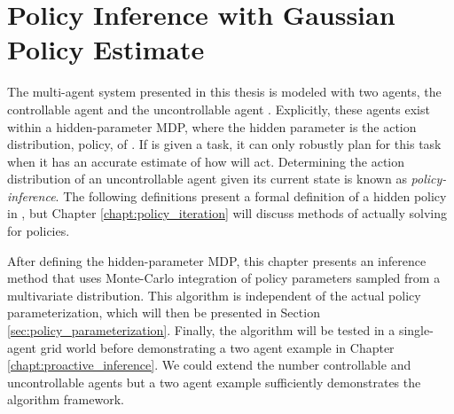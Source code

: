 %
%
\chapter{Policy Inference with Gaussian Policy Estimate}\label{chapt:gauss_policy}

    The multi-agent system presented in this thesis is modeled with two agents, the controllable agent  and the
    uncontrollable agent . Explicitly, these agents exist within a hidden-parameter \ac{MDP}, where the hidden
    parameter is the action distribution, policy, of . If  is given a task, it can only robustly plan
    for this task when it has an accurate estimate of how  will act. Determining the action distribution of an
    uncontrollable agent given its current state is known as \textit{policy-inference}. The following definitions
    present a formal definition of a hidden policy in , but Chapter \ref{chapt:policy_iteration} will discuss
    methods of actually solving for policies.

    After defining the hidden-parameter MDP, this chapter presents an inference method that uses Monte-Carlo integration
    of policy parameters sampled from a multivariate distribution. This algorithm is independent of the actual policy
    parameterization, which will then be presented in Section \ref{sec:policy_parameterization}.  Finally, the algorithm
    will be tested in a single-agent grid world before demonstrating a two agent example in Chapter
    \ref{chapt:proactive_inference}. We could extend the number controllable and uncontrollable agents but a two agent
    example sufficiently demonstrates the algorithm framework.



